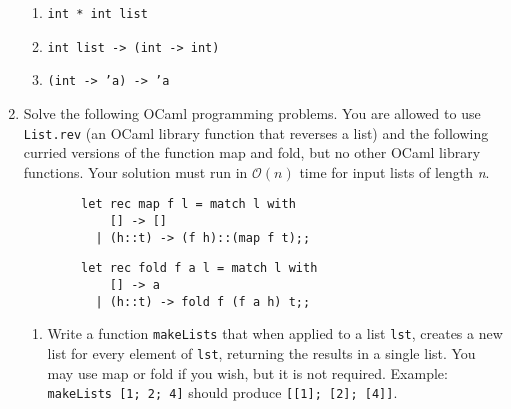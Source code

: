 \documentclass[11pt]{article}
\begin{document}
\begin{enumerate}
          \vspace{-2.5mm}

          \begin{enumerate}

            \addtolength{\itemsep}{0mm}

            \item \texttt{int * int list}

            \item \texttt{int list -> (int -> int)}

            \item \texttt{(int -> 'a) -> 'a}

          \end{enumerate}

          \vspace{-2.5mm}

    \item Solve the following OCaml programming problems.  You are allowed
          to use \texttt{List.rev} (an OCaml library function that reverses
          a list) and the following curried versions of the function map and
          fold, but no other OCaml library functions. Your solution must run
          in $\mathcal{O}(n)$ time for input lists of length \emph{n}.

          \vspace{-1.5mm}

          \begin{multicols}{2}

            \begin{Verbatim}
        let rec map f l = match l with
            [] -> []
          | (h::t) -> (f h)::(map f t);;
            \end{Verbatim}

            \columnbreak

            \begin{Verbatim}
        let rec fold f a l = match l with
            [] -> a
          | (h::t) -> fold f (f a h) t;;
            \end{Verbatim}

          \end{multicols}

          \vspace{-4mm}

          \begin{enumerate}

            \addtolength{\itemsep}{4mm}

            \item Write a function \texttt{makeLists} that when applied to a
                  list \texttt{lst}, creates a new list for every element of
                  \texttt{lst}, returning the results in a single list.  You
                  may use map or fold if you wish, but it is not required.
                  Example: \texttt{makeLists [1; 2; 4]} should produce
                  \texttt{[[1]; [2]; [4]]}.


\end{enumerate}
\end{enumerate}
\end{document}
